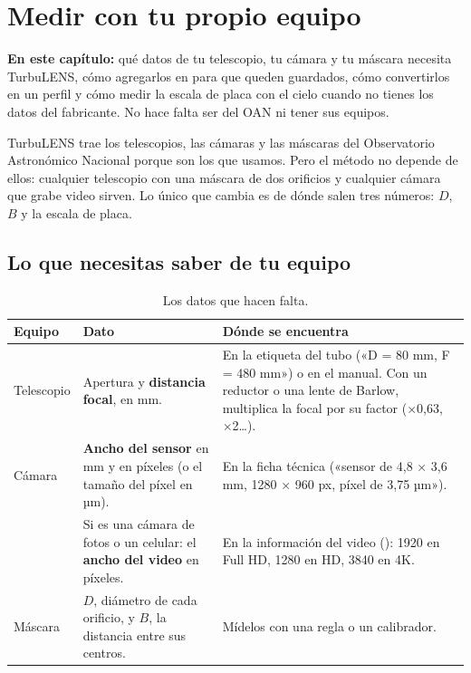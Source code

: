 \chapter{Medir con tu propio equipo}\label{cap:propio}

\begin{resumen}
\textbf{En este capítulo:} qué datos de tu telescopio, tu cámara y tu máscara necesita TurbuLENS, cómo agregarlos en
 para que queden guardados, cómo convertirlos en un perfil y cómo medir la escala de placa con el
cielo cuando no tienes los datos del fabricante. No hace falta ser del OAN ni tener sus equipos.
\end{resumen}

TurbuLENS trae los telescopios, las cámaras y las máscaras del Observatorio Astronómico Nacional porque son los que
usamos. Pero el método no depende de ellos: cualquier telescopio con una máscara de dos orificios y cualquier cámara que
grabe video sirven. Lo único que cambia es de dónde salen tres números: $D$, $B$ y la escala de placa.

\section{Lo que necesitas saber de tu equipo}

\begin{table}[H]
\centering\small
\begin{tabularx}{\linewidth}{@{}l Y Y@{}}
\toprule
Equipo & Dato & Dónde se encuentra\\
\midrule
Telescopio & Apertura y \textbf{distancia focal}, en mm. & En la etiqueta del tubo («D = 80 mm, F = 480 mm») o en el
manual. Con un reductor o una lente de Barlow, multiplica la focal por su factor (×0,63, ×2\ldots).\\
Cámara & \textbf{Ancho del sensor} en mm y en píxeles (o el tamaño del píxel en µm). & En la ficha técnica
(«sensor de 4,8 × 3,6 mm, 1280 × 960 px, píxel de 3,75 µm»).\\
 & Si es una cámara de fotos o un celular: el \textbf{ancho del video} en píxeles. & En la información del video
(): 1920 en Full HD, 1280 en HD, 3840 en 4K.\\
Máscara & \textbf{$D$}, diámetro de cada orificio, y \textbf{$B$}, la distancia entre sus centros. & Mídelos con una regla
o un calibrador.\\
\bottomrule
\end{tabularx}
\caption{Los datos que hacen falta.}
\end{table}

